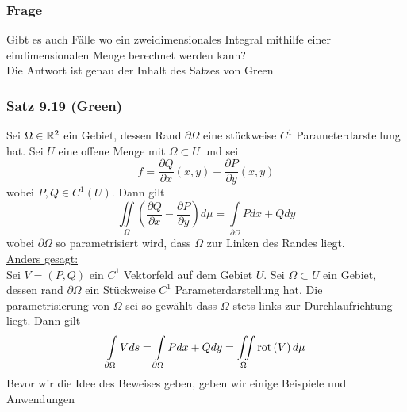 \subsubsection*{Frage}
Gibt es auch Fälle wo ein zweidimensionales Integral mithilfe einer eindimensionalen Menge berechnet werden kann?\\

\noindent Die Antwort ist genau der Inhalt des Satzes von Green

\subsubsection*{Satz 9.19 (Green)}
Sei $\Omega \in\mathbb{R}^2$ ein Gebiet, dessen Rand $\partial\Omega$ eine stückweise $C^1$ Parameterdarstellung hat. Sei $U$ eine offene Menge mit $\Omega\subset U$ und sei
\[ f=\frac{\partial Q}{\partial x}\left( x,y\right) -\frac{\partial P}{\partial y}\left( x,y\right) \]
wobei $P,Q\in C^1\left( U\right)$. Dann gilt
\[ \iint\limits_\Omega \left(\frac{\partial Q}{\partial x}-\frac{\partial P}{\partial y}\right)d\mu = \int\limits_{\partial \Omega } {Pdx + Qdy} \]
wobei $\partial \Omega$ so parametrisiert wird, dass $\Omega$ zur Linken des Randes liegt. \\

\noindent\underline{Anders gesagt:}\\

\noindent Sei $V=\left( P,Q\right)$ ein $C^1$ Vektorfeld auf dem Gebiet $U$. Sei $\Omega\subset U$ ein Gebiet, dessen rand $\partial\Omega$ ein Stückweise $C^1$ Parameterdarstellung hat. Die parametrisierung von $\Omega$ sei so gewählt dass $\Omega$ stets links zur Durchlaufrichtung liegt. Dann gilt
\[\int\limits_{\partial \Omega } {Vds}  = \int\limits_{\partial \Omega } {Pdx + Qdy}  = \iint\limits_\Omega \operatorname{rot}\left( V \right)d\mu \]
Bevor wir die Idee des Beweises geben, geben wir einige Beispiele und Anwendungen

